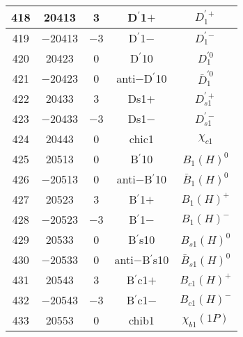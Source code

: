 \documentclass{article}
\begin{document}
\begin{table}[!htbp]
\begin{tabular}{|c|c|c|c|c|}
\hline
418 & 20413 & 3 & D$^{\prime}$\underline{\hspace{0.6em}}1$+$ & $D_{1}^{\prime+}$ \\
\hline
419 & $-$20413 & $-$3 & D$^{\prime}$\underline{\hspace{0.6em}}1$-$ & $D_{1}^{\prime-}$ \\
\hline
420 & 20423 & 0 & D$^{\prime}$\underline{\hspace{0.6em}}10 & $D_{1}^{\prime0}$ \\
\hline
421 & $-$20423 & 0 & anti$-$D$^{\prime}$\underline{\hspace{0.6em}}10 & $\bar{D}_{1}^{\prime0}$ \\
\hline
422 & 20433 & 3 & D\underline{\hspace{0.6em}}s1$+$ & $D_{s1}^{\prime+}$ \\
\hline
423 & $-$20433 & $-$3 & D\underline{\hspace{0.6em}}s1$-$ & $D_{s1}^{\prime-}$ \\
\hline
424 & 20443 & 0 & chi\underline{\hspace{0.6em}}c1 & $\chi_{c1}$ \\
\hline
425 & 20513 & 0 & B$^{\prime}$\underline{\hspace{0.6em}}10 & $B_{1}(H)^{0}$ \\
\hline
426 & $-$20513 & 0 & anti$-$B$^{\prime}$\underline{\hspace{0.6em}}10 & $\bar{B}_{1}(H)^{0}$ \\
\hline
427 & 20523 & 3 & B$^{\prime}$\underline{\hspace{0.6em}}1$+$ & $B_{1}(H)^{+}$ \\
\hline
428 & $-$20523 & $-$3 & B$^{\prime}$\underline{\hspace{0.6em}}1$-$ & $B_{1}(H)^{-}$ \\
\hline
429 & 20533 & 0 & B$^{\prime}$\underline{\hspace{0.6em}}s10 & $B_{s1}(H)^{0}$ \\
\hline
430 & $-$20533 & 0 & anti$-$B$^{\prime}$\underline{\hspace{0.6em}}s10 & $\bar{B}_{s1}(H)^{0}$ \\
\hline
431 & 20543 & 3 & B$^{\prime}$\underline{\hspace{0.6em}}c1$+$ & $B_{c1}(H)^{+}$ \\
\hline
432 & $-$20543 & $-$3 & B$^{\prime}$\underline{\hspace{0.6em}}c1$-$ & $B_{c1}(H)^{-}$ \\
\hline
433 & 20553 & 0 & chi\underline{\hspace{0.6em}}b1 & $\chi_{b1}(1P)$ \\

\end{tabular}
\end{table}
\end{document}
